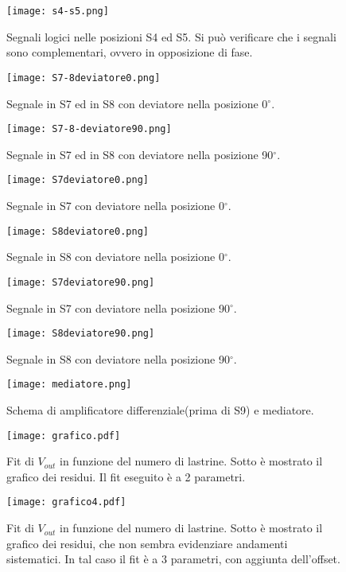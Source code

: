 \begin{figure}[h]
	\centering
	\texttt{[image: s4-s5.png]}
	\caption{Segnali logici nelle posizioni S4 ed S5. Si può verificare che i segnali sono complementari, ovvero in opposizione di fase.}
	\label{f:s4-s5}
\end{figure}

\begin{figure}[h]
	\centering
	\texttt{[image: S7-8deviatore0.png]}
	\caption{Segnale in S7 ed in S8 con deviatore nella posizione 0$^\circ$.}
	\label{f:S7-8deviatore0}
\end{figure}

\begin{figure}[h]
	\centering
	\texttt{[image: S7-8-deviatore90.png]}
	\caption{Segnale in S7 ed in S8 con deviatore nella posizione 90$^\circ$.}
	\label{f:S7-8deviatore90}
\end{figure}

\begin{figure}[h]
	\centering
	\texttt{[image: S7deviatore0.png]}
	\caption{Segnale in S7 con deviatore nella posizione 0$^\circ$.}
	\label{f:S7deviatore0}
\end{figure}

\begin{figure}[h]
	\centering
	\texttt{[image: S8deviatore0.png]}
	\caption{Segnale in S8 con deviatore nella posizione 0$^\circ$.}
	\label{f:S8deviatore0}
\end{figure}

\begin{figure}[h]
	\centering
	\texttt{[image: S7deviatore90.png]}
	\caption{Segnale in S7 con deviatore nella posizione 90$^\circ$.}
	\label{f:S7deviatore90}
\end{figure}



\begin{figure}[h]
	\centering
	\texttt{[image: S8deviatore90.png]}
	\caption{Segnale in S8 con deviatore nella posizione 90$^\circ$.}
	\label{f:S8deviatore90}
\end{figure}

\begin{figure}[h]
	\centering
	\texttt{[image: mediatore.png]}
	\caption{Schema di amplificatore differenziale(prima di S9) e mediatore.}
	\label{f:Mediatore}
\end{figure}

\begin{figure}[h]
	\centering
	\texttt{[image: grafico.pdf]}
	\caption{Fit di $V_{out}$ in funzione del numero di lastrine. Sotto è mostrato il grafico dei residui. Il fit eseguito è a 2 parametri.}
	\label{f:Grafico}
\end{figure}
\begin{figure}[h]
	\centering
	\texttt{[image: grafico4.pdf]}
	\caption{Fit di $V_{out}$ in funzione del numero di lastrine. Sotto è mostrato il grafico dei residui, che non sembra evidenziare andamenti sistematici. In tal caso il fit è a 3 parametri, con aggiunta dell'offset.}
	\label{f:Grafico4}
\end{figure}